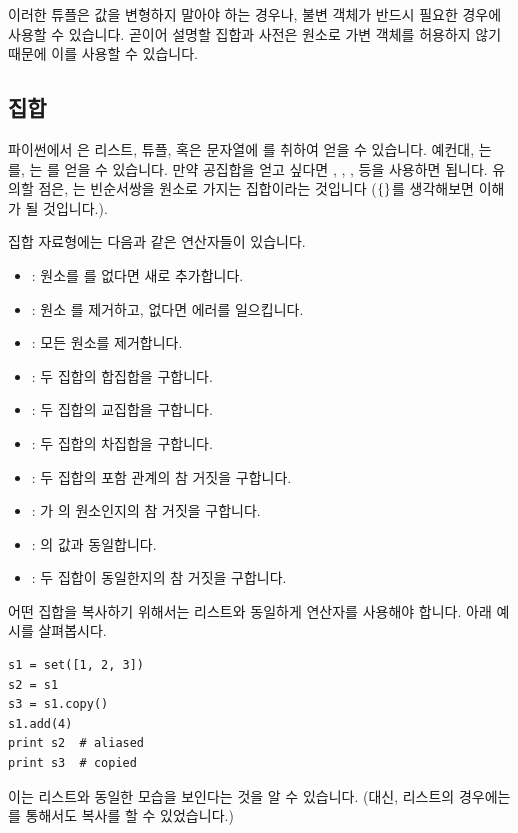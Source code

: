 \documentclass[../main.tex]{subfiles}
\begin{document}
이러한 튜플은 값을 변형하지 말아야 하는 경우나, 불변 객체가 반드시 필요한 경우에 사용할 수 있습니다.
곧이어 설명할 집합과 사전은 원소로 가변 객체를 허용하지 않기 때문에 이를 사용할 수 있습니다.

\subsection{집합}
파이썬에서 은 리스트, 튜플, 혹은 문자열에 를 취하여 얻을 수 있습니다.
예컨대, 는 를, 는  를 얻을 수 있습니다.
만약 공집합을 얻고 싶다면 , , ,  등을 사용하면 됩니다.
유의할 점은, 는 빈순서쌍을 원소로 가지는 집합이라는 것입니다 ($\{\empty\}$를 생각해보면 이해가 될 것입니다.).

집합 자료형에는 다음과 같은 연산자들이 있습니다.
\begin{itemize}
    \item {}: 원소를 를 없다면 새로 추가합니다.
    \item {}: 원소 를 제거하고, 없다면 에러를 일으킵니다.
    \item {}: 모든 원소를 제거합니다.
    \item {}: 두 집합의 합집합을 구합니다.
    \item {}: 두 집합의 교집합을 구합니다.
    \item {}: 두 집합의 차집합을 구합니다.
    \item {}: 두 집합의 포함 관계의 참 거짓을 구합니다.
    \item {}: 가 의 원소인지의 참 거짓을 구합니다.
    \item {}: 의 값과 동일합니다.
    \item {}: 두 집합이 동일한지의 참 거짓을 구합니다.
\end{itemize}

어떤 집합을 복사하기 위해서는 리스트와 동일하게  연산자를 사용해야 합니다.
아래 예시를 살펴봅시다.
\begin{verbatim}
s1 = set([1, 2, 3])
s2 = s1
s3 = s1.copy()
s1.add(4)
print s2  # aliased
print s3  # copied
\end{verbatim}
이는 리스트와 동일한 모습을 보인다는 것을 알 수 있습니다.
(대신, 리스트의 경우에는 \pyin{[:]}를 통해서도 복사를 할 수 있었습니다.)
\end{document}
